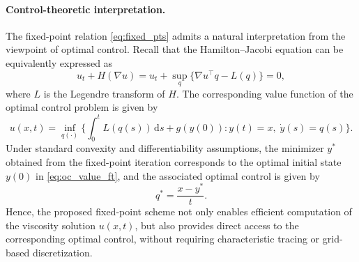 \documentclass[review,hidelinks,onefignum,onetabnum]{siamart250106}
\begin{document}
\paragraph{Control-theoretic interpretation.}
The fixed-point relation \eqref{eq:fixed_pts} admits a natural interpretation from the viewpoint of optimal control.  
Recall that the Hamilton--Jacobi equation can be equivalently expressed as
\[
u_t + H(\nabla u) = u_t + \sup_{q}\{\nabla u^\top q - L(q)\} = 0,
\]
where \(L\) is the Legendre transform of \(H\).  
The corresponding value function of the optimal control problem is given by
\begin{equation}\label{eq:oc_value_ft}
    u( x ,t) = \inf_{q(\cdot)} \Bigg\{ \int_0^t L(q(s))\,\mathrm{d}s + g( y (0))
    :  y (t)= x ,\; \dot{ y }(s)=q(s) \Bigg\}.
\end{equation}
Under standard convexity and differentiability assumptions, the minimizer \(y^\ast\) obtained from the fixed-point iteration corresponds to the optimal initial state \( y (0)\) in \eqref{eq:oc_value_ft}, and the associated optimal control is given by
\begin{equation}\label{eq:control_from_y}
q^\ast = \frac{x - y^\ast}{t}.
\end{equation}
Hence, the proposed fixed-point scheme not only enables efficient computation of the viscosity solution \(u(x,t)\), but also provides direct access to the corresponding optimal control, without requiring characteristic tracing or grid-based discretization.
\end{document}
